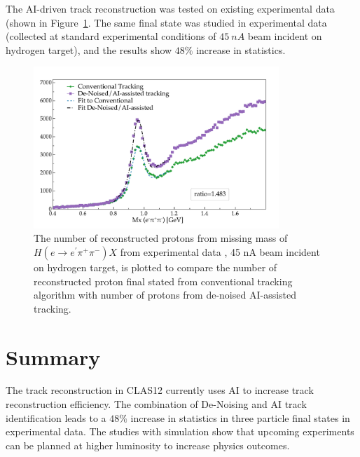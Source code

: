 \documentclass{webofc}
\begin{document}
The AI-driven track reconstruction was tested on existing experimental data (shown in Figure~\ref{physics::conv_vs_dnai}. The same final state 
was studied in experimental data (collected at standard experimental conditions of $45~nA$ beam incident on hydrogen target), and the results
show $48\%$ increase in statistics.

\begin{figure}[!h]
\begin{center}
 \includegraphics[height=2.4in]{images/rga_conv_vs_dnai.pdf}
\caption { 
The number of reconstructed protons from missing mass of $H(e \rightarrow e^\prime \pi^+ \pi^-) X$ from experimental data 
, 45 nA beam incident on hydrogen target, is plotted to compare the number of reconstructed proton final stated from conventional tracking algorithm with 
number of protons from de-noised AI-assisted tracking. 
}
 \label{physics::conv_vs_dnai}
 \end{center}
\end{figure}

\section{Summary}
\label{section-summary}

The track reconstruction in CLAS12 currently uses AI to increase track reconstruction efficiency. The combination of De-Noising 
and AI track identification leads to a $48\%$ increase in statistics in three particle final states in experimental data. The studies 
with simulation show that upcoming experiments can be planned at higher luminosity to increase physics outcomes. 
\end{document}
